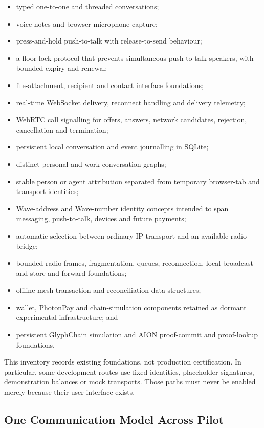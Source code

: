 \begin{itemize}
  \item typed one-to-one and threaded conversations;
  \item voice notes and browser microphone capture;
  \item press-and-hold push-to-talk with release-to-send behaviour;
  \item a floor-lock protocol that prevents simultaneous push-to-talk speakers,
        with bounded expiry and renewal;
  \item file-attachment, recipient and contact interface foundations;
  \item real-time WebSocket delivery, reconnect handling and delivery telemetry;
  \item WebRTC call signalling for offers, answers, network candidates,
        rejection, cancellation and termination;
  \item persistent local conversation and event journalling in SQLite;
  \item distinct personal and work conversation graphs;
  \item stable person or agent attribution separated from temporary browser-tab
        and transport identities;
  \item Wave-address and Wave-number identity concepts intended to span
        messaging, push-to-talk, devices and future payments;
  \item automatic selection between ordinary IP transport and an available
        radio bridge;
  \item bounded radio frames, fragmentation, queues, reconnection, local
        broadcast and store-and-forward foundations;
  \item offline mesh transaction and reconciliation data structures;
  \item wallet, PhotonPay and chain-simulation components retained as dormant
        experimental infrastructure; and
  \item persistent GlyphChain simulation and AION proof-commit and proof-lookup
        foundations.
\end{itemize}

This inventory records existing foundations, not production certification. In
particular, some development routes use fixed identities, placeholder
signatures, demonstration balances or mock transports. Those paths must never
be enabled merely because their user interface exists.

\subsection{One Communication Model Across Pilot}

